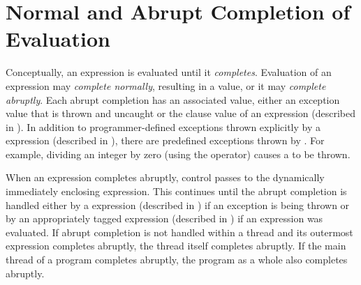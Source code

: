 %
%
%
%

\section{Normal and Abrupt Completion of Evaluation}


Conceptually, an expression is evaluated until it \emph{completes}.
Evaluation of an expression may \emph{complete normally}, resulting in
a value, or it may \emph{complete abruptly}.  Each abrupt completion
has an associated value, either
an exception value that is thrown and uncaught
or the  clause value of an  expression (described in
).
  In addition to programmer-defined exceptions
thrown explicitly by a  expression (described in
), there are predefined exceptions thrown by
\library.  For example, dividing an integer by zero (using the \EXP{/}
operator) causes a  to be thrown.

When an expression completes abruptly, control passes to the
dynamically immediately enclosing expression.
This continues until the abrupt completion is handled
either
by a  expression (described in )
if an exception is being thrown
or by an appropriately tagged  expression
(described in )
if an  expression was evaluated.
If abrupt completion is not handled within a thread
and its outermost expression completes abruptly,
the thread itself completes abruptly.
If the main thread of a program completes abruptly,
the program as a whole also completes abruptly.

